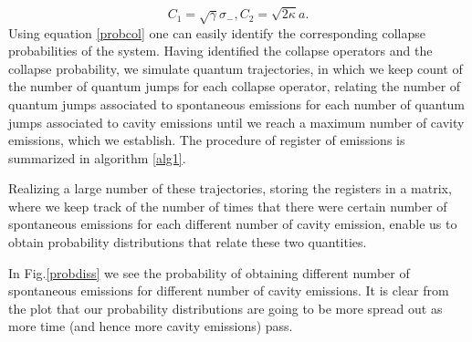 \documentclass[conference]{IEEEtran}
\begin{document}
\begin{subequations}
\begin{equation}
C_1 = \sqrt{\gamma}\sigma_-,
\end{equation}
\begin{equation}
C_2 = \sqrt{2\kappa}a.
\end{equation}
\end{subequations}
Using equation \eqref{probcol} one can easily identify the corresponding collapse probabilities of the system. Having identified the collapse operators and the collapse probability, we simulate quantum trajectories, in which we keep count of the number of quantum jumps for each collapse operator, relating the number of quantum jumps associated to spontaneous emissions for each number of quantum jumps associated to cavity emissions until we reach a maximum number of cavity emissions, which we establish. The procedure of register of emissions is summarized in algorithm \ref{alg1}. 

Realizing a large number of these trajectories, storing the registers in a matrix, where we keep track of the number of times that there were certain number of spontaneous emissions for each different number of cavity emission, enable us to obtain probability distributions that relate these two quantities.  

In Fig.\ref{probdiss} we see the probability of obtaining different number of spontaneous emissions for different number of cavity emissions. It is clear from the plot that our probability distributions are going to be more spread out as more time (and hence more cavity emissions) pass.
\end{document}
